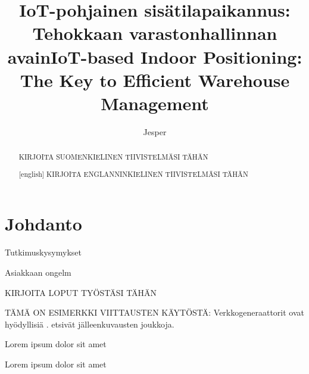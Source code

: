 \documentclass[bscthesis,finnish,oneside,biblatex]{uefcsthesis}
\title{IoT-pohjainen sisätilapaikannus: Tehokkaan varastonhallinnan avain} %
\title[english]{IoT-based Indoor Positioning: The Key to Efficient Warehouse Management} %
\author{Jesper}{Kauppinen} %
\date{\thismonth} %
\begin{document}
\maketitle
\begin{abstract}
KIRJOITA SUOMENKIELINEN TIIVISTELMÄSI TÄHÄN
\end{abstract}

\begin{abstract}[english]
KIRJOITA ENGLANNINKIELINEN TIIVISTELMÄSI TÄHÄN
\end{abstract}

\frontmatter
\tableofcontents
\mainmatter

\chapter{Johdanto}
\label{cha:johdanto}

Tutkimuskysymykset



\label{cha:aihe}



Asiakkaan ongelm

KIRJOITA LOPUT TYÖSTÄSI TÄHÄN

TÄMÄ ON ESIMERKKI VIITTAUSTEN KÄYTÖSTÄ:
Verkkogeneraattorit ovat hyödyllisiä \citep{metzler18random}.
\citet{kalofolias18from} etsivät jälleenkuvausten joukkoja.

Lorem ipsum dolor sit amet\citep{zafari2019survey}

\citet{zafari2019survey} Lorem ipsum dolor sit amet

\printbibliography[heading=bibintoc]

\backmatter %
\end{document}

